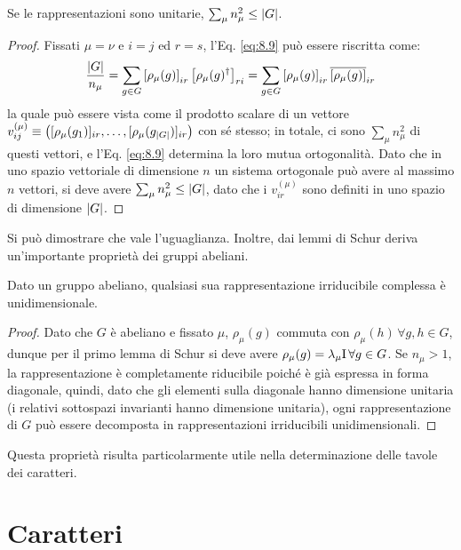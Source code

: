 \begin{corollary}\label{cond-n-mu}
	Se le rappresentazioni sono unitarie, $ \sum_{\mu} n_{\mu}^2 \le \left\lvert G\right\rvert $.
\end{corollary}
\begin{proof}
	Fissati $ \mu = \nu $ e $ i = j $ ed $ r = s $, l'Eq. \ref{eq:8.9} può essere riscritta come:
	\begin{equation*}
		\frac{\left\lvert G\right\rvert}{n_{\mu}} = \sum_{g \in G} \left[ \rho_{\mu}(g) \right]_{ir} \left[ \rho_{\mu}(g)^{\dagger} \right]_{ri} = \sum_{g \in G} \left[ \rho_{\mu}(g) \right]_{ir} \overline{\left[ \rho_{\mu}(g) \right]}_{ir}
	\end{equation*}
	la quale può essere vista come il prodotto scalare di un vettore $ v^{(\mu)}_{ij} \equiv \left( [\rho_{\mu}(g_1)]_{ir}, \dots, [\rho_{\mu}(g_{\left\lvert G\right\rvert})]_{ir} \right) $ con sé stesso; in totale, ci sono $ \sum_{\mu} n_{\mu}^2 $ di questi vettori, e l'Eq. \ref{eq:8.9} determina la loro mutua ortogonalità. Dato che in uno spazio vettoriale di dimensione $ n $ un sistema ortogonale può avere al massimo $ n $ vettori, si deve avere $ \sum_{\mu} n_{\mu}^2 \le \left\lvert G\right\rvert $, dato che i $ v^{(\mu)}_{ir} $ sono definiti in uno spazio di dimensione $ \left\lvert G\right\rvert $.
\end{proof}

Si può dimostrare che vale l'uguaglianza. Inoltre, dai lemmi di Schur deriva un'importante proprietà dei gruppi abeliani.

\begin{proposition}\label{irrep-unidim}
	Dato un gruppo abeliano, qualsiasi sua rappresentazione irriducibile complessa è unidimensionale.
\end{proposition}
\begin{proof}
	Dato che $ G $ è abeliano e fissato $ \mu $, $ \rho_{\mu}(g) $ commuta con $ \rho_{\mu}(h) \,\forall g,h \in G $, dunque per il primo lemma di Schur si deve avere $ \rho_{\mu}(g) = \lambda_{\mu} \mathrm{I} \,\forall g \in G $. Se $ n_{\mu} > 1 $, la rappresentazione è completamente riducibile poiché è già espressa in forma diagonale, quindi, dato che gli elementi sulla diagonale hanno dimensione unitaria (i relativi sottospazi invarianti hanno dimensione unitaria), ogni rappresentazione di $ G $ può essere decomposta in rappresentazioni irriducibili unidimensionali.
\end{proof}

Questa proprietà risulta particolarmente utile nella determinazione delle tavole dei caratteri.

\section{Caratteri}
\label{sec-char}

